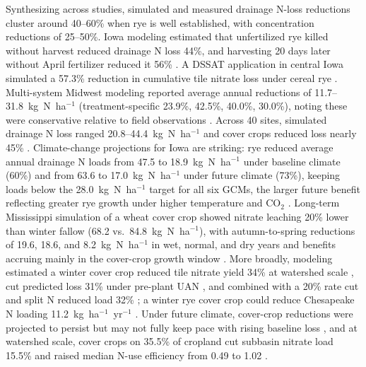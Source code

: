 \documentclass[11pt]{article}
\begin{document}
Synthesizing across studies, simulated and measured drainage N-loss reductions cluster around 40--60\% when rye is well established, with concentration reductions of 25--50\%. Iowa modeling estimated that unfertilized rye killed without harvest reduced drainage N loss 44\%, and harvesting 20 days later without April fertilizer reduced it 56\% \parencite{Malone2018}. A DSSAT application in central Iowa simulated a 57.3\% reduction in cumulative tile nitrate loss under cereal rye \parencite{Chatterjee2025}. Multi-system Midwest modeling reported average annual reductions of 11.7--31.8~kg~N~ha$^{-1}$ (treatment-specific 23.9\%, 42.5\%, 40.0\%, 30.0\%), noting these were conservative relative to field observations \parencite{Malone2014b}. Across 40 sites, simulated drainage N loss ranged 20.8--44.4~kg~N~ha$^{-1}$ and cover crops reduced loss nearly 45\% \parencite{Malone2023}. Climate-change projections for Iowa are striking: rye reduced average annual drainage N loads from 47.5 to 18.9~kg~N~ha$^{-1}$ under baseline climate (60\%) and from 63.6 to 17.0~kg~N~ha$^{-1}$ under future climate (73\%), keeping loads below the 28.0~kg~N~ha$^{-1}$ target for all six GCMs, the larger future benefit reflecting greater rye growth under higher temperature and CO$_2$ \parencite{Malone2020}. Long-term Mississippi simulation of a wheat cover crop showed nitrate leaching 20\% lower than winter fallow (68.2 vs.\ 84.8~kg~N~ha$^{-1}$), with autumn-to-spring reductions of 19.6, 18.6, and 8.2~kg~N~ha$^{-1}$ in wet, normal, and dry years and benefits accruing mainly in the cover-crop growth window \parencite{Yang2021}. More broadly, modeling estimated a winter cover crop reduced tile nitrate yield 34\% at watershed scale \parencite{David2015}, cut predicted loss 31\% under pre-plant UAN \parencite{Malone2007b}, and combined with a 20\% rate cut and split N reduced load 32\% \parencite{Singh2023}; a winter rye cover crop could reduce Chesapeake N loading 11.2~kg~ha$^{-1}$~yr$^{-1}$ \parencite{Woodbury2018}. Under future climate, cover-crop reductions were projected to persist but may not fully keep pace with rising baseline loss \parencite{Gupta2023}, and at watershed scale, cover crops on 35.5\% of cropland cut subbasin nitrate load 15.5\% and raised median N-use efficiency from 0.49 to 1.02 \parencite{Makhtoumi2025}.
\end{document}
